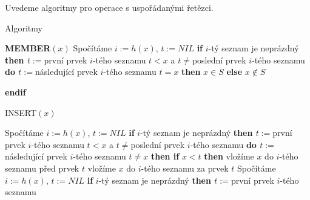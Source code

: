 \documentclass[a4paper,12pt]{article}
\begin{document}
Uvedeme algoritmy pro operace s uspořádanými 
ře\-těz\-ci.

\subhead
Algoritmy
\endsubhead

{\bf MEMBER$(x)$}\newline 
Spočítáme $i:=h(x)$, $t:=NIL$\newline 
{\bf if} $i$-tý seznam je neprázdný {\bf then\newline 
\phantom{{\rm ---}}$t:=$}první prvek $i$-tého seznamu\newline 
\phantom{---}{\bf while} $t<x$ a $t\ne$poslední prvek $i$-tého seznamu {\bf do\newline 
\phantom{{\rm ------}}$t:=$}následující prvek $i$-tého seznamu\newline 
\phantom{---}{\bf enddo\newline 
endif \newline 
if} $t=x$ {\bf then} $x\in S$ {\bf else} $x\notin S$ {\bf endif

INSERT$(x)$}\newline 
Spočítáme $i:=h(x)$, $t:=NIL$\newline 
{\bf if} $i$-tý seznam je neprázdný {\bf then\newline 
\phantom{{\rm ---}}$t:=$}první prvek $i$-tého seznamu\newline 
\phantom{---}{\bf while} $t<x$ a $t\ne$poslední prvek $i$-tého seznamu {\bf do\newline 
\phantom{{\rm ------}}$t:=$}následující prvek $i$-tého seznamu\newline 
\phantom{---}{\bf enddo\newline 
endif \newline 
if} $t\ne x$ {\bf then\newline 
\phantom{{\rm ---}}if} $x<t$ {\bf then\newline 
\phantom{{\rm ------}}}vložíme $x$ do $i$-tého seznamu před prvek $
t$\newline 
\phantom{---}{\bf else}\newline  
\phantom{------}vložíme $x$ do $i$-tého seznamu za prvek $
t$\newline 
\phantom{---}{\bf endif\newline 
endif

DELETE$(x)$}\newline 
Spočítáme $i:=h(x)$, $t:=NIL$\newline
{\bf if} $i$-tý seznam je neprázdný {\bf then\newline 
\phantom{{\rm ---}}$t:=$}první prvek $i$-tého seznamu\newline 
\end{document}
